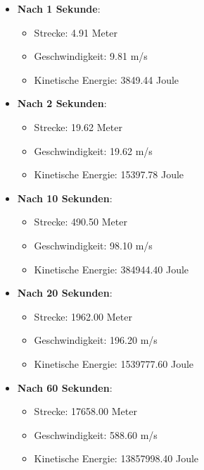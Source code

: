 \documentclass{vorlage-design-main}
\begin{document}
\begin{itemize}

\item
  \textbf{Nach 1 Sekunde}:

  \begin{itemize}
  
  \item
    Strecke: 4.91 Meter
  \item
    Geschwindigkeit: 9.81 m/s
  \item
    Kinetische Energie: 3849.44 Joule
  \end{itemize}
\item
  \textbf{Nach 2 Sekunden}:

  \begin{itemize}
  
  \item
    Strecke: 19.62 Meter
  \item
    Geschwindigkeit: 19.62 m/s
  \item
    Kinetische Energie: 15397.78 Joule
  \end{itemize}
\item
  \textbf{Nach 10 Sekunden}:

  \begin{itemize}
  
  \item
    Strecke: 490.50 Meter
  \item
    Geschwindigkeit: 98.10 m/s
  \item
    Kinetische Energie: 384944.40 Joule
  \end{itemize}
\item
  \textbf{Nach 20 Sekunden}:

  \begin{itemize}
  
  \item
    Strecke: 1962.00 Meter
  \item
    Geschwindigkeit: 196.20 m/s
  \item
    Kinetische Energie: 1539777.60 Joule
  \end{itemize}
\item
  \textbf{Nach 60 Sekunden}:

  \begin{itemize}
  
  \item
    Strecke: 17658.00 Meter
  \item
    Geschwindigkeit: 588.60 m/s
  \item
    Kinetische Energie: 13857998.40 Joule
  \end{itemize}
\end{itemize}
\end{document}
